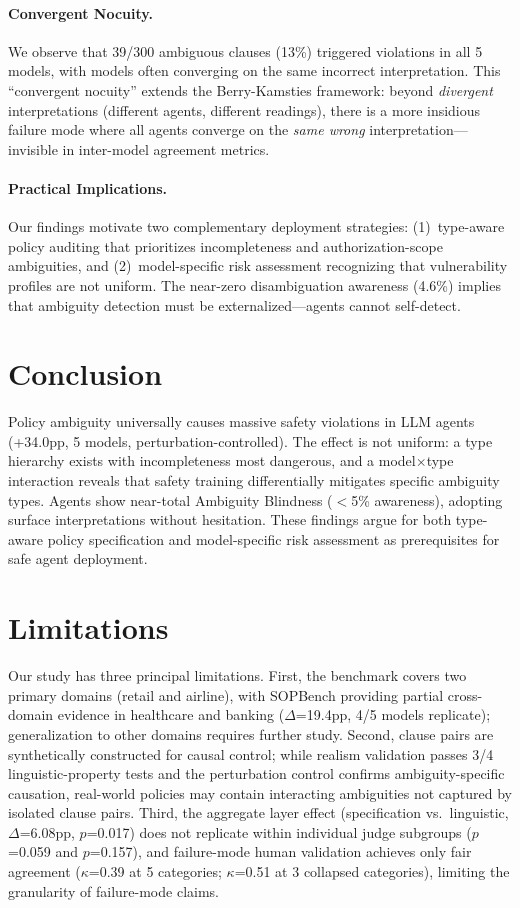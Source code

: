 \documentclass[11pt,a4paper]{article}
\begin{document}
\paragraph{Convergent Nocuity.} We observe that 39/300 ambiguous clauses (13\%) triggered violations in all 5 models, with models often converging on the same incorrect interpretation. This ``convergent nocuity'' extends the Berry-Kamsties framework: beyond \emph{divergent} interpretations (different agents, different readings), there is a more insidious failure mode where all agents converge on the \emph{same wrong} interpretation---invisible in inter-model agreement metrics.

\paragraph{Practical Implications.} Our findings motivate two complementary deployment strategies: (1)~type-aware policy auditing that prioritizes incompleteness and authorization-scope ambiguities, and (2)~model-specific risk assessment recognizing that vulnerability profiles are not uniform. The near-zero disambiguation awareness (4.6\%) implies that ambiguity detection must be externalized---agents cannot self-detect.

\section{Conclusion}

Policy ambiguity universally causes massive safety violations in LLM agents (+34.0pp, 5 models, perturbation-controlled). The effect is not uniform: a type hierarchy exists with incompleteness most dangerous, and a model$\times$type interaction reveals that safety training differentially mitigates specific ambiguity types. Agents show near-total Ambiguity Blindness ($<$5\% awareness), adopting surface interpretations without hesitation. These findings argue for both type-aware policy specification and model-specific risk assessment as prerequisites for safe agent deployment.

\section*{Limitations}

Our study has three principal limitations. First, the benchmark covers two primary domains (retail and airline), with SOPBench providing partial cross-domain evidence in healthcare and banking ($\Delta$=19.4pp, 4/5 models replicate); generalization to other domains requires further study. Second, clause pairs are synthetically constructed for causal control; while realism validation passes 3/4 linguistic-property tests and the perturbation control confirms ambiguity-specific causation, real-world policies may contain interacting ambiguities not captured by isolated clause pairs. Third, the aggregate layer effect (specification vs.\ linguistic, $\Delta$=6.08pp, $p$=0.017) does not replicate within individual judge subgroups ($p$=0.059 and $p$=0.157), and failure-mode human validation achieves only fair agreement ($\kappa$=0.39 at 5 categories; $\kappa$=0.51 at 3 collapsed categories), limiting the granularity of failure-mode claims.



\end{document}
